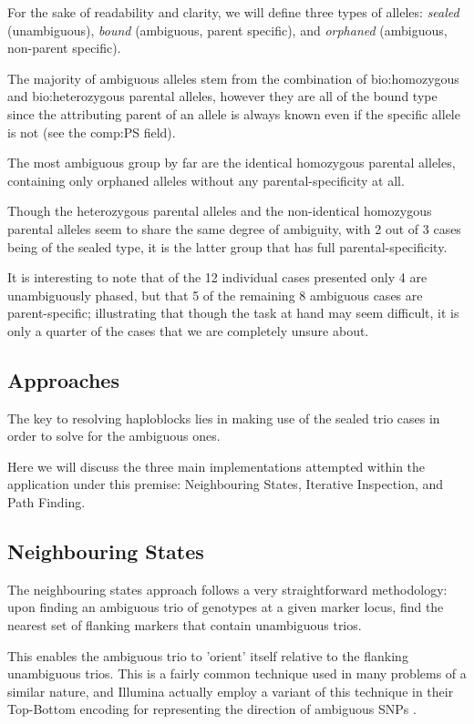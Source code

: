 For the sake of readability and clarity, we will define three types of alleles: \textit{sealed} (unambiguous), \textit{bound} (ambiguous, parent specific), and \textit{orphaned} (ambiguous, non-parent specific).

The majority of ambiguous alleles stem from the combination of \gls{bio:homozygous} and \gls{bio:heterozygous} parental alleles, however they are all of the bound type since the attributing parent of an allele is always known even if the specific allele is not (see the \gls{comp:PS} field).

The most ambiguous group by far are the identical homozygous parental alleles, containing only orphaned alleles without any parental-specificity at all.

Though the heterozygous parental alleles and the non-identical homozygous parental alleles seem to share the same degree of ambiguity, with 2 out of 3 cases being of the sealed type, it is the latter group that has full parental-specificity.

It is interesting to note that of the 12 individual cases presented only 4 are unambiguously phased, but that 5 of the remaining 8 ambiguous cases are parent-specific; illustrating that though the task at hand may seem difficult, it is only a quarter of the cases that we are completely unsure about.


\subsection{Approaches}

The key to resolving haploblocks lies in making use of the sealed trio cases in order to solve for the ambiguous ones. 

Here we will discuss the three main implementations attempted within the application under this premise: Neighbouring States, Iterative Inspection, and Path Finding.

\subsection{Neighbouring States}

The neighbouring states approach follows a very straightforward methodology: upon finding an ambiguous trio of genotypes at a given marker locus, find the nearest set of flanking markers that contain unambiguous trios.

This enables the ambiguous trio to 'orient' itself relative to the flanking unambiguous trios.  This is a fairly common technique used in many problems of a similar nature, and Illumina actually employ a variant of this technique in their Top-Bottom encoding for representing the direction of ambiguous SNPs \cite{illuminatopbot}.

